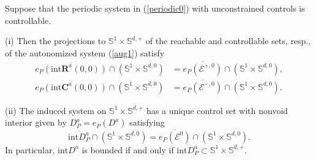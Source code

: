 \documentclass{siamltex}%
\begin{document}
\begin{theorem}
\label{Theorem_ep}Suppose that the periodic system in (\ref{periodic0}) with
unconstrained controls is controllable.

(i) Then the projections to $\mathbb{S}^{1}\times\mathbb{S}^{d,+}$ of the
reachable and controllable sets, resp., of the autonomized system (\ref{aug1})
satisfy%
\begin{align*}
\overline{e_{P}(\mathrm{int}\mathbf{R}^{a}(0,0))}\cap\left(  \mathbb{S}%
^{1}\times\mathbb{S}^{d,0}\right)   &  =\overline{e_{P}(\mathcal{E}^{+,0}%
)}\cap\left(  \mathbb{S}^{1}\times\mathbb{S}^{d,0}\right)  ,\\
\overline{e_{P}(\mathrm{int}\mathbf{C}^{a}(0,0))}\cap\left(  \mathbb{S}%
^{1}\times\mathbb{S}^{d,0}\right)   &  =\overline{e_{P}(\mathcal{E}^{-,0}%
)}\cap\left(  \mathbb{S}^{1}\times\mathbb{S}^{d,0}\right)  .
\end{align*}


(ii) The induced system on $\mathbb{S}^{1}\times\mathbb{S}^{d,+}$ has a unique
control set with nonvoid interior given by $D_{P}^{a}=e_{P}(D^{a})$ satisfying%
\[
\overline{\mathrm{int}D_{P}^{a}}\cap(\mathbb{S}^{1}\times\mathbb{S}%
^{d,0})=\overline{e_{P}\left(  \mathcal{E}^{0}\right)  }\cap\left(
\mathbb{S}^{1}\times\mathbb{S}^{d,0}\right)  .
\]
In particular, $\mathrm{int}D^{a}$ is bounded if and only if $\overline
{\mathrm{int}D_{P}^{a}}\subset\mathbb{S}^{1}\times\mathbb{S}^{d,+}$.
\end{theorem}
\end{document}
